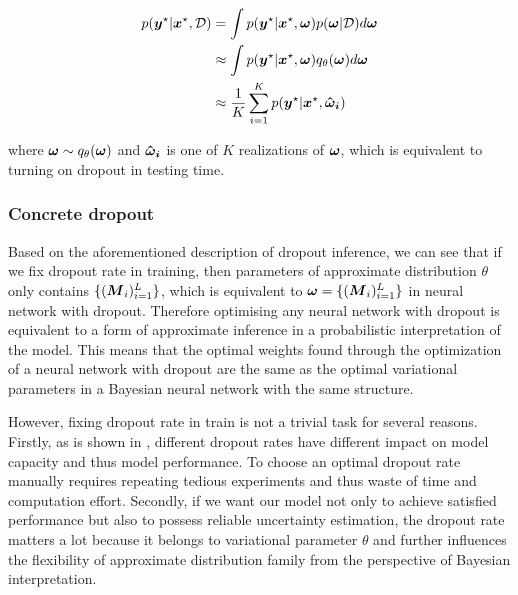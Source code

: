 \begin{equation}
\begin{aligned} \label{marginalization_test}
p(\boldsymbol y^{\star}| \boldsymbol x^{\star},\mathcal D) &= \int p(\boldsymbol y^{\star} | \boldsymbol x^{\star}, \boldsymbol \omega) p(\boldsymbol \omega |\mathcal D)d\boldsymbol \omega \\
&\approx \int p(\boldsymbol y^{\star} | \boldsymbol x^{\star}, \boldsymbol \omega) q_{\theta}(\boldsymbol \omega)d\boldsymbol \omega \\
&\approx \frac{1}{K}\sum_{i=1}^{K} p(\boldsymbol y^{\star} | \boldsymbol x^{\star}, \boldsymbol{\hat \omega_{i}}) 
\end{aligned}
\end{equation}

where $\boldsymbol \omega \sim q_{\theta}(\boldsymbol \omega)$ and $\boldsymbol{\hat \omega_{i}}$ is one of $K$ realizations of $\boldsymbol \omega$, which is equivalent to turning on dropout in testing time. 


\subsubsection{Concrete dropout}
Based on the aforementioned description of dropout inference, we can see that if we fix dropout rate in training, then parameters of approximate distribution $\theta$ only contains $\{(\boldsymbol M_{i})^L_{i=1}\}$, which is equivalent to $\boldsymbol \omega = \{(\boldsymbol M_{i})^L_{i=1}\}$ in neural network with dropout. Therefore optimising any neural network with dropout is equivalent to a form of approximate inference in a probabilistic interpretation of the model. This means that the optimal weights found through the optimization of a neural network with dropout are the same as the optimal variational parameters in a Bayesian neural network with the same structure. 

However, fixing dropout rate in train is not a trivial task for several reasons. Firstly, as is shown in \cite{srivastava2014dropout}, different dropout rates have different impact on model capacity and thus model performance. To choose an optimal dropout rate manually requires repeating tedious experiments and thus waste of time and computation effort. Secondly, if we want our model not only to achieve satisfied performance but also to possess reliable uncertainty estimation, the dropout rate matters a lot because it belongs to variational parameter $\theta$ and further influences the flexibility of approximate distribution family from the perspective of Bayesian interpretation.

